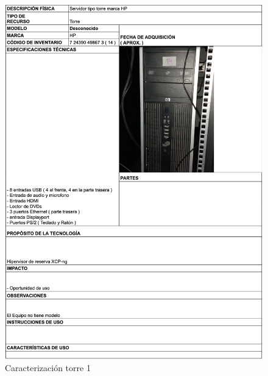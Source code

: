 \begin{figure}[H]
    \centering
    \includegraphics[width=\textwidth] {tablas-images/cp1/torres/torre-1.png}
    \caption{Caracterización torre 1}\label{fig:torre-1}
\end{figure}

